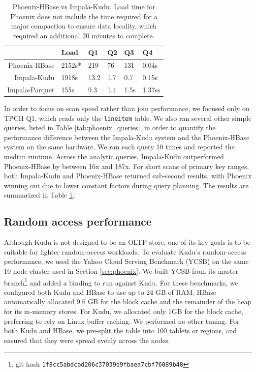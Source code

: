 \documentclass[twocolumn,9pt]{article}
\begin{document}
\begin{table}
\begin{tabular}{r|lllll}
              & Load   &  Q1  &  Q2 &  Q3  &  Q4\\\hline
Phoenix-HBase & 2152s* & 219  & 76  & 131  & 0.04s\\
Impala-Kudu   & 1918s  & 13.2 & 1.7 & 0.7  & 0.15s\\
Impala-Parquet& 155s   & 9.3  & 1.4 & 1.5s  & 1.37ss
\end{tabular}
\caption{Phoenix-HBase vs Impala-Kudu. Load time for Phoenix does not include the time required for a major compaction to
ensure data locality, which required an additional 20 minutes to complete.}
\label{tab:phoenix_results}
\end{table}

In order to focus on scan speed rather than join performance, we focused only on TPCH Q1, which
reads only the {\tt lineitem} table. We also ran several other simple queries, listed in
Table \ref{tab:phoenix_queries}, in order to quantify the performance difference between
the Impala-Kudu system and the Phoenix-HBase system on the same hardware. We ran each
query 10 times and reported the median runtime. Across the analytic queries, Impala-Kudu
outperformed Phoenix-HBase by between 16x and 187x. For short scans of primary key
ranges, both Impala-Kudu and Phoenix-HBase returned sub-second results, with Phoenix winning
out due to lower constant factors during query planning. The results are summarized in
Table \ref{tab:phoenix_results}.

\subsection{Random access performance}

Although Kudu is not designed to be an OLTP store, one of its key goals is to be suitable for
lighter random-access workloads. To evaluate Kudu's random-access performance, we used
the Yahoo Cloud Serving Benchmark (YCSB)\cite{ycsb} on the same 10-node cluster used in
Section \ref{sec:phoenix}. We built YCSB from its master
branch\footnote{git hash {\tt 1f8cc5abdcad206c37039d9fbaea7cbf76089b48}} and added a binding to
run against Kudu. For these benchmarks, we configured both Kudu and HBase to use up to
24 GB of RAM. HBase automatically allocated 9.6 GB for the block cache and the remainder of the
heap for its in-memory stores. For Kudu, we allocated only 1GB for the block cache, preferring
to rely on Linux buffer caching. We performed no other tuning. For both Kudu and HBase, we pre-split
the table into 100 tablets or regions, and ensured that they were spread evenly across
the nodes.
\end{document}
